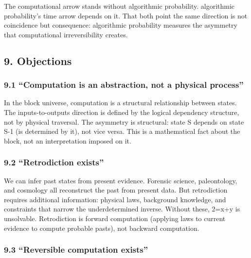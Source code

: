 \documentclass[
]{article}
\begin{document}
The computational arrow stands without algorithmic probability.
algorithmic probability's time arrow depends on it. That both point the
same direction is not coincidence but consequence: algorithmic
probability measures the asymmetry that computational irreversibility
creates.

\subsection{9. Objections}\label{objections}

\subsubsection{9.1 ``Computation is an abstraction, not a physical
process''}\label{computation-is-an-abstraction-not-a-physical-process}

In the block universe, computation is a structural relationship between
states. The inputs-to-outputs direction is defined by the logical
dependency structure, not by physical traversal. The asymmetry is
structural: state S depends on state S-1 (is determined by it), not vice
versa. This is a mathematical fact about the block, not an
interpretation imposed on it.

\subsubsection{9.2 ``Retrodiction exists''}\label{retrodiction-exists}

We can infer past states from present evidence. Forensic science,
paleontology, and cosmology all reconstruct the past from present data.
But retrodiction requires additional information: physical laws,
background knowledge, and constraints that narrow the underdetermined
inverse. Without these, 2=x+y is unsolvable. Retrodiction is forward
computation (applying laws to current evidence to compute probable
pasts), not backward computation.

\subsubsection{9.3 ``Reversible computation
exists''}\label{reversible-computation-exists}
\end{document}
